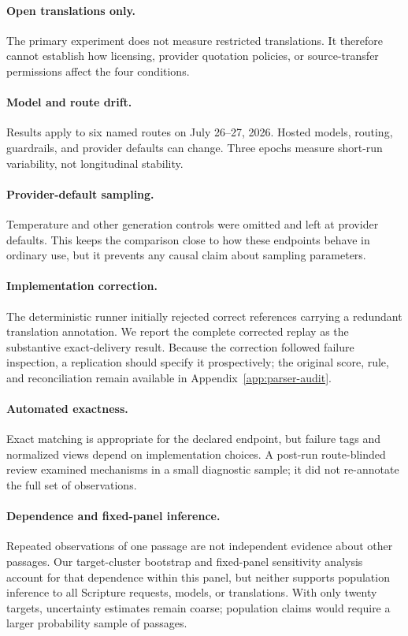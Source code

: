 \documentclass[11pt]{article}
\begin{document}
\paragraph{Open translations only.}
The primary experiment does not measure restricted translations. It therefore
cannot establish how licensing, provider quotation policies, or source-transfer
permissions affect the four conditions.

\paragraph{Model and route drift.}
Results apply to six named routes on July 26--27, 2026. Hosted models, routing,
guardrails, and provider defaults can change. Three epochs measure short-run
variability, not longitudinal stability.

\paragraph{Provider-default sampling.}
Temperature and other generation controls were omitted and left at provider
defaults. This keeps the comparison close to how these endpoints
behave in ordinary use, but it prevents any causal claim about sampling
parameters.

\paragraph{Implementation correction.}
The deterministic runner initially rejected correct references carrying a
redundant translation annotation. We report the complete corrected replay as the
substantive exact-delivery result. Because the correction followed failure
inspection, a replication should specify it prospectively; the original score,
rule, and reconciliation remain available in Appendix~\ref{app:parser-audit}.

\paragraph{Automated exactness.}
Exact matching is appropriate for the declared endpoint, but failure tags and
normalized views depend on implementation choices. A post-run route-blinded
review examined mechanisms in a small diagnostic sample; it did not re-annotate
the full set of observations.

\paragraph{Dependence and fixed-panel inference.}
Repeated observations of one passage are not independent evidence about other
passages. Our target-cluster bootstrap and fixed-panel sensitivity analysis
account for that dependence within this panel, but neither supports population
inference to all Scripture requests, models, or translations. With only twenty
targets, uncertainty estimates remain coarse; population claims would require
a larger probability sample of passages.
\end{document}
